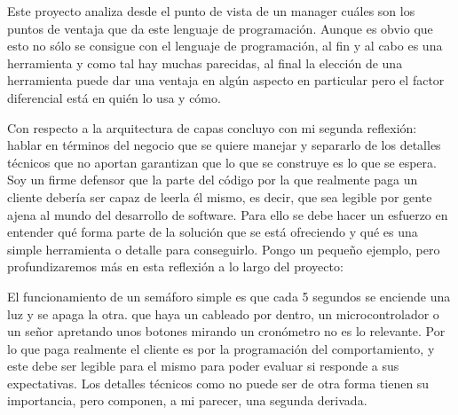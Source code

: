 Este proyecto analiza desde el punto de vista de un manager cuáles son los puntos de ventaja que da este lenguaje de programación. Aunque es obvio que esto no sólo se consigue con el lenguaje de programación, al fin y al cabo es una herramienta y como tal hay muchas parecidas, al final la elección de una herramienta puede dar una ventaja en algún aspecto en particular pero el factor diferencial está en quién lo usa y cómo.

Con respecto a la arquitectura de capas concluyo con mi segunda reflexión: hablar en términos del negocio que se quiere manejar y separarlo de los detalles técnicos que no aportan garantizan que lo que se construye es lo que se espera. Soy un firme defensor que la parte del código por la que realmente paga un cliente debería ser capaz de leerla él mismo, es decir, que sea legible por gente ajena al mundo del desarrollo de software. Para ello se debe hacer un esfuerzo en entender qué forma parte de la solución que se está ofreciendo y qué es una simple herramienta o detalle para conseguirlo. Pongo un pequeño ejemplo, pero profundizaremos más en esta reflexión a lo largo del proyecto:

El funcionamiento de un semáforo simple es que cada 5 segundos se enciende una luz y se apaga la otra. que haya un cableado por dentro, un microcontrolador o un señor apretando unos botones mirando un cronómetro no es lo relevante. Por lo que paga realmente el cliente es por la programación del comportamiento, y este debe ser legible para el mismo para poder evaluar si responde a sus expectativas. Los detalles técnicos como no puede ser de otra forma tienen su importancia, pero componen, a mi parecer, una segunda derivada.

